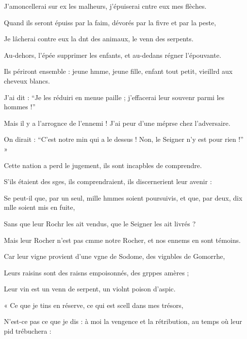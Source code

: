 \item J’amoncellerai sur ex les malheurs,\psstar{} j’épuiserai cntre eux mes flèches.
\item Quand ils seront épuiss par la faim,\psstar{} dévorés par la fivre et par la peste,
\item Je lâcherai contre eux la dnt des animaux,\psstar{} le venn des serpents.
\item Au-dehors, l’épée supprimer les enfants,\psstar{} et au-dedans régner l’épouvante.
\item Ils périront ensemble : jeune hmme, jeune fille,\psstar{} enfant tout petit, vieillrd aux cheveux blancs.
\item J’ai dit : “Je les réduiri en menue paille ;\psstar{} j’effacerai leur souvenr parmi les hommes !” 
\item Mais il y a l’arrognce de l’ennemi !\psstar{} J’ai peur d’une méprse chez l’adversaire. 
\item On dirait : “C’est notre min qui a le dessus !\psstar{} Non, le Seigner n’y est pour rien !” »
\item Cette nation a perd le jugement,\psstar{} ils sont incapbles de comprendre.
\item S’ils étaient des sges, ils comprendraient,\psstar{} ils discernerient leur avenir :
\item Se peut-il que, par un seul, mille hmmes soient poursuivis,\psstar{} et que, par deux, dix mlle soient mis en fuite,
\item Sans que leur Rochr les ait vendus,\psstar{} que le Seigner les ait livrés ?
\item Mais leur Rocher n’est pas cmme notre Rocher,\psstar{} et nos ennems en sont témoins.
\item Car leur vigne provient d’une vgne de Sodome,\psstar{} des vignbles de Gomorrhe,
\item Leurs raisins sont des raisns empoisonnés,\psstar{} des grppes amères ;
\item Leur vin est un venn de serpent,\psstar{} un violnt poison d’aspic.
\item « Ce que je tins en réserve,\psstar{} ce qui est scell dans mes trésors,
\item N’est-ce pas ce que je dis :\pscross{} à moi la vengence et la rétribution,\psstar{} au temps où leur pid trébuchera : 
